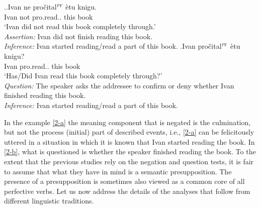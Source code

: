 \ex.\label{2}\ag.\label{2-a}Ivan ne pro\v{c}ital$^{\textsc{pf}}$ \`{e}tu knigu.\\
Ivan not pro.read.. this book\\
\trans `Ivan did not read this book completely through.'\\
\textit{Assertion:} Ivan did not finish reading this book.\\
\textit{Inference:} Ivan started reading/read a part of this book.
\bg.\label{2-b}Ivan pro\v{c}ital$^{\textsc{pf}}$ \`{e}tu knigu?\\
Ivan pro.read.. this book\\
\trans `Has/Did Ivan read this book completely through?'\\
\textit{Question:} The speaker asks the addressee to confirm or deny whether Ivan finished reading this book.\\
\textit{Inference:} Ivan started reading/read a part of this book.

In the example \ref{2-a} the meaning component that is negated is the culmination, but not the process (initial) part of described events, i.e., \ref{2-a} can be felicitously uttered in a situation in which it is known that Ivan started reading the book. In \ref{2-b}, what is questioned is whether the speaker finished reading the book. To the extent that the previous studies rely on the negation and question tests, it is fair to assume that what they have in mind is a semantic presupposition. The presence of a presupposition is sometimes \citep[e.g., by][]{Paducheva:96, Romanova:04} also viewed as a common core of all perfective verbs. Let us now address the details of the analyses that follow from different linguistic traditions.


